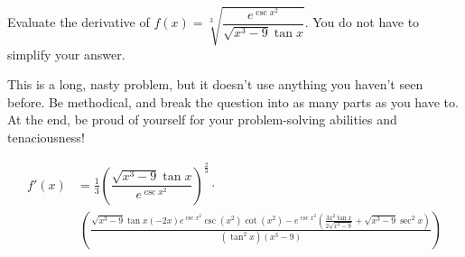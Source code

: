 \begin{question}
Evaluate the derivative of $f(x)=\sqrt[3]{\dfrac{e^{\csc x^2}}{ \sqrt{x^3-9} \tan x }}$. You do not have to simplify your answer.
\end{question}
\begin{hint}
This is a long, nasty problem, but it doesn't use anything you haven't seen before. Be methodical, and break the question into as many parts as you have to. At the end, be proud of yourself for your problem-solving abilities and tenaciousness!
\end{hint}
\begin{answer}
\begin{align*} f'(x)&=
\frac{1}{3}\left(
\dfrac{ \sqrt{x^3-9} \tan x }{e^{\csc x^2}}
\right)^{\frac{2}{3}}\cdot\\
&~\left(\frac{ \sqrt{x^3-9}\tan x  {(-2x)e^{\csc x^2}\csc(x^2)\cot(x^2)}-e^{\csc x^2}{\left(\frac{3x^2\tan x}{2\sqrt{{x^3-9}}}+\sqrt{x^3-9}\sec^2 x\right)}}{(\tan^2 x)(x^3-9) }\right)
\end{align*}
\end{answer}
